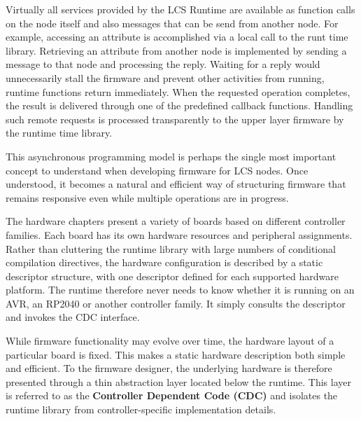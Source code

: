 Virtually all services provided by the LCS Runtime are available as function calls on the node itself and also messages that can be send from another node. For example, accessing an attribute is accomplished via a local call to the runt time library. Retrieving an attribute from another node is implemented by sending a message to that node and processing the reply. Waiting for a reply would unnecessarily stall the firmware and prevent other activities from running, runtime functions return immediately. When the requested operation completes, the result is delivered through one of the predefined callback functions. Handling such remote requests is processed transparently to the upper layer firmware by the runtime time library.

This asynchronous programming model is perhaps the single most important concept to understand when developing firmware for LCS nodes. Once understood, it becomes a natural and efficient way of structuring firmware that remains responsive even while multiple operations are in progress.


The hardware chapters present a variety of boards based on different controller families. Each board has its own hardware resources and peripheral assignments. Rather than cluttering the runtime library with large numbers of conditional compilation directives, the hardware configuration is described by a static descriptor structure, with one descriptor defined for each supported hardware platform. The runtime therefore never needs to know whether it is running on an AVR, an RP2040 or another controller family. It simply consults the descriptor and invokes the CDC interface.

While firmware functionality may evolve over time, the hardware layout of a particular board is fixed. This makes a static hardware description both simple and efficient. To the firmware designer, the underlying hardware is therefore presented through a thin abstraction layer located below the runtime. This layer is referred to as the \textbf{Controller Dependent Code (CDC)} and isolates the runtime library from controller-specific implementation details.
